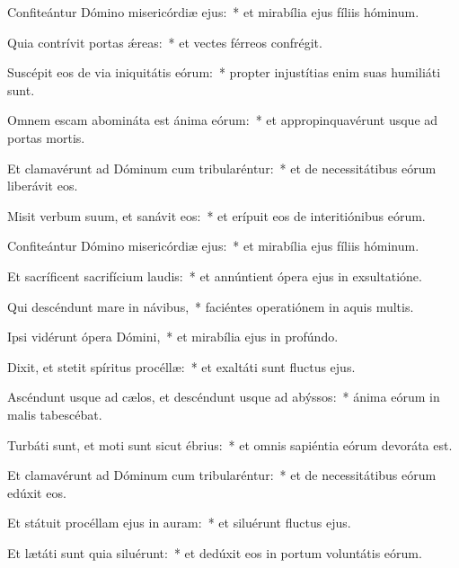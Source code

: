 
\item Confiteántur Dómino misericórdiæ ejus:~* et mirabília ejus fíliis hóminum.

\item Quia contrívit portas ǽreas:~* et vectes férreos confrégit.

\item Suscépit eos de via iniquitátis eórum:~* propter injustítias enim suas humiliáti sunt.

\item Omnem escam abomináta est ánima eórum:~* et appropinquavérunt usque ad portas mortis.

\item Et clamavérunt ad Dóminum cum tribularéntur:~* et de necessitátibus eórum liberávit eos.

\item Misit verbum suum, et sanávit eos:~* et erípuit eos de interitiónibus eórum.

\item Confiteántur Dómino misericórdiæ ejus:~* et mirabília ejus fíliis hóminum.

\item Et sacríficent sacrifícium laudis:~* et annúntient ópera ejus in exsultatióne.

\item Qui descéndunt mare in návibus,~* faciéntes operatiónem in aquis multis.

\item Ipsi vidérunt ópera Dómini,~* et mirabília ejus in profúndo.

\item Dixit, et stetit spíritus procéllæ:~* et exaltáti sunt fluctus ejus.

\item Ascéndunt usque ad cælos, et descéndunt usque ad abýssos:~* ánima eórum in malis tabescébat.

\item Turbáti sunt, et moti sunt sicut ébrius:~* et omnis sapiéntia eórum devoráta est.

\item Et clamavérunt ad Dóminum cum tribularéntur:~* et de necessitátibus eórum edúxit eos.

\item Et státuit procéllam ejus in auram:~* et siluérunt fluctus ejus.

\item Et lætáti sunt quia siluérunt:~* et dedúxit eos in portum voluntátis eórum.
